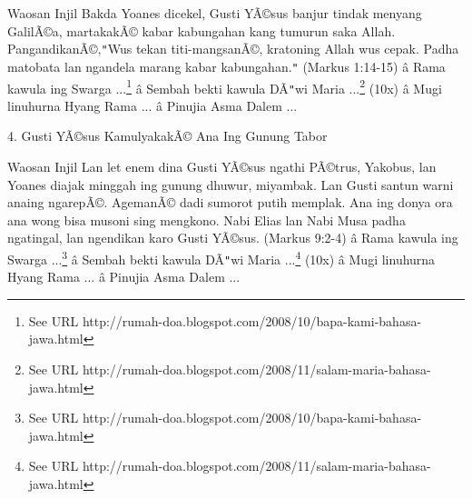 Waosan Injil
Bakda Yoanes dicekel, Gusti Y\~A\copyright{}sus banjur tindak menyang Galil\~A\copyright{}a, martakak\~A\copyright{} kabar kabungahan kang tumurun saka Allah. Pangandikan\~A\copyright{},\texttt{{}"{}}Wus tekan titi-mangsan\~A\copyright{}, kratoning Allah wus cepak. Padha matobata lan ngandela marang kabar kabungahan.\texttt{{}"{}} (Markus 1:14-15)
\newline
 \^a\*  Rama kawula ing Swarga ...\footnote{See URL http://rumah-doa.blogspot.com/2008/10/bapa-kami-bahasa-jawa.html}\newline
 \^a\*  Sembah bekti kawula D\~A\texttt{{}"{}}wi Maria ...\footnote{See URL http://rumah-doa.blogspot.com/2008/11/salam-maria-bahasa-jawa.html} (10x)\newline
 \^a\*  Mugi linuhurna Hyang Rama ...\newline
 \^a\*  Pinujia Asma Dalem ...\newline


4. Gusti Y\~A\copyright{}sus Kamulyakak\~A\copyright{} Ana Ing Gunung Tabor

\newline


Waosan Injil
Lan let enem dina Gusti Y\~A\copyright{}sus ngathi P\~A\copyright{}trus, Yakobus, lan Yoanes diajak minggah ing gunung dhuwur, miyambak. Lan Gusti santun warni anaing ngarep\~A\copyright{}. Ageman\~A\copyright{} dadi sumorot putih memplak. Ana ing donya ora ana wong bisa musoni sing mengkono. Nabi Elias lan Nabi Musa padha ngatingal, lan ngendikan karo Gusti Y\~A\copyright{}sus. (Markus 9:2-4)
\newline
 \^a\*  Rama kawula ing Swarga ...\footnote{See URL http://rumah-doa.blogspot.com/2008/10/bapa-kami-bahasa-jawa.html}\newline
 \^a\*  Sembah bekti kawula D\~A\texttt{{}"{}}wi Maria ...\footnote{See URL http://rumah-doa.blogspot.com/2008/11/salam-maria-bahasa-jawa.html} (10x)\newline
 \^a\*  Mugi linuhurna Hyang Rama ...\newline
 \^a\*  Pinujia Asma Dalem ...\newline

